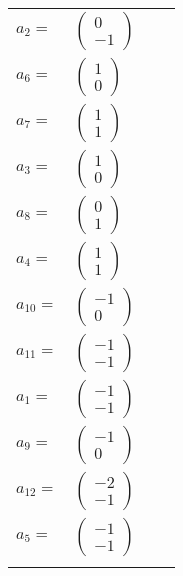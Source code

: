 \documentclass[1p]{elsarticle_modified}
\theoremstyle{definition}
\begin{document}
\begin{tabular}{m{7pt} m{180pt} m{7pt} m{180pt} }
\flushright $a_{2}=$&$\begin{pmatrix}0\\-1\end{pmatrix}$ \\
\flushright $a_{6}=$&$\begin{pmatrix}1\\0\end{pmatrix}$ \\
\flushright $a_{7}=$&$\begin{pmatrix}1\\1\end{pmatrix}$ \\
\flushright $a_{3}=$&$\begin{pmatrix}1\\0\end{pmatrix}$ \\
\flushright $a_{8}=$&$\begin{pmatrix}0\\1\end{pmatrix}$ \\
\flushright $a_{4}=$&$\begin{pmatrix}1\\1\end{pmatrix}$ \\
\flushright $a_{10}=$&$\begin{pmatrix}-1\\0\end{pmatrix}$ \\
\flushright $a_{11}=$&$\begin{pmatrix}-1\\-1\end{pmatrix}$ \\
\flushright $a_{1}=$&$\begin{pmatrix}-1\\-1\end{pmatrix}$ \\
\flushright $a_{9}=$&$\begin{pmatrix}-1\\0\end{pmatrix}$ \\
\flushright $a_{12}=$&$\begin{pmatrix}-2\\-1\end{pmatrix}$ \\
\flushright $a_{5}=$&$\begin{pmatrix}-1\\-1\end{pmatrix}$\\&\end{tabular}
\end{document}
